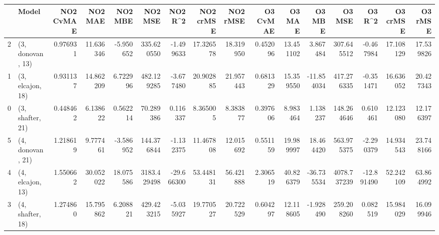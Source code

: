 \begin{tabular}{llrrrrrrrrrrrrrr}
\toprule
{} &             Model &  NO2 CvMAE &    NO2 MAE &    NO2 MBE &      NO2 MSE &    NO2 R\textasciicircum2 &  NO2 crMSE &   NO2 rMSE &  O3 CvMAE &     O3 MAE &     O3 MBE &       O3 MSE &     O3 R\textasciicircum2 &   O3 crMSE &    O3 rMSE \\
\midrule
2 &  (3, donovan, 13) &   0.976931 &  11.636346 &  -5.950652 &   335.620550 &  -1.499633 &  17.326578 &  18.319950 &  0.452096 &  13.451102 &   3.867484 &   307.645512 &  -0.467984 &  17.108129 &  17.539826 \\
1 &  (3, elcajon, 18) &   0.931137 &  14.862209 &   6.722996 &   482.129285 &  -3.677480 &  20.902885 &  21.957443 &  0.681329 &  15.359550 & -11.854034 &   417.276335 &  -0.351471 &  16.636052 &  20.427343 \\
0 &  (3, shafter, 21) &   0.448462 &   6.138622 &   0.562214 &    70.289386 &   0.116337 &   8.365005 &   8.383877 &  0.397606 &   8.983464 &   1.138237 &   148.264646 &   0.610461 &  12.123080 &  12.176397 \\
5 &  (4, donovan, 21) &   1.218619 &   9.777461 &  -3.586952 &   144.376844 &  -1.132375 &  11.467808 &  12.015692 &  0.551159 &  19.989997 &  18.464420 &   563.975375 &  -2.290379 &  14.934543 &  23.748166 \\
4 &  (4, elcajon, 13) &   1.550662 &  30.052022 &  18.075586 &  3183.429498 & -29.666300 &  53.448131 &  56.421888 &  2.306519 &  40.826379 & -36.735534 &  4078.737239 & -12.891490 &  52.242109 &  63.864992 \\
3 &  (4, shafter, 18) &   1.274860 &  15.795862 &   6.208821 &   429.423215 &  -5.035927 &  19.770527 &  20.722529 &  0.604297 &  12.118605 &  -1.928490 &   259.208260 &   0.082519 &  15.984029 &  16.099946 \\
\bottomrule
\end{tabular}
